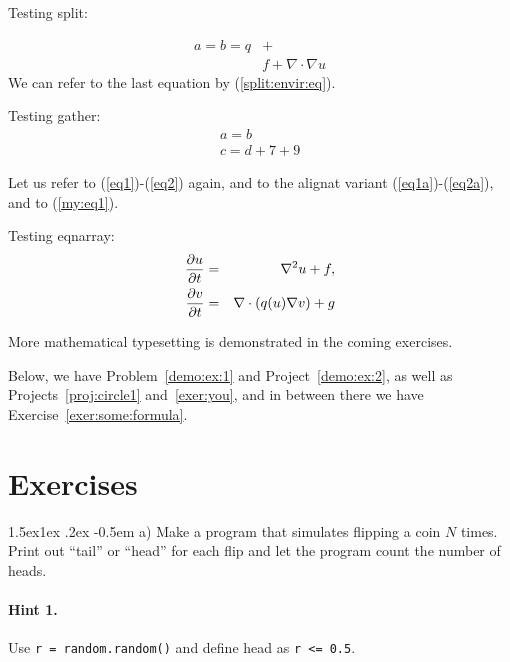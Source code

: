 \documentclass[%
oneside,                 %
final,                   %
10pt]{article}
\makeatletter
\newenvironment{doconceexercise}{}{}
\newcounter{doconceexercisecounter}
\newcommand\subex{\@startsection{paragraph}{4}{\z@}%
                  {1.5ex\@plus1ex \@minus.2ex}%
                  {-0.5em}%
                  {\normalfont\normalsize\bfseries}}
\theoremstyle{definition}
\makeatother
\begin{document}
\begin{enumerate}
Testing split:

\begin{equation}
\label{split:envir:eq}
\begin{split}
a = b = q &+ \\ 
  & f + \nabla\cdot\nabla u
\end{split}
\end{equation}
We can refer to the last equation by (\ref{split:envir:eq}).

Testing gather:
\begin{gather}
a = b \\ 
c = d + 7 + 9
\end{gather}

Let us refer to (\ref{eq1})-(\ref{eq2}) again, and to the
alignat variant (\ref{eq1a})-(\ref{eq2a}), and to (\ref{my:eq1}).

Testing eqnarray:
\begin{eqnarray}
{\partial u\over\partial t} &=& \nabla^2 u + f, \label{myeq1}\\ 
{\partial v\over\partial t} &=& \nabla\cdot(q(u)\nabla v) + g \label{myeq2}
\end{eqnarray}

More mathematical typesetting is demonstrated in the coming exercises.

Below, we have Problem~\vref{demo:ex:1} and Project~\vref{demo:ex:2},
as well as Projects~\vref{proj:circle1} and~\vref{exer:you}, and in
between there we have Exercise~\vref{exer:some:formula}.

\section{Exercises}

\begin{doconceexercise}

                             
\label{demo:ex:1}


\subex{a)}
Make a program that simulates flipping a coin $N$ times.
Print out ``tail'' or ``head'' for each flip and
let the program count the number of heads.


\paragraph{Hint 1.}
Use \texttt{r = random.random()} and define head as \texttt{r <= 0.5}.


\end{doconceexercise}
\end{enumerate}
\end{document}
